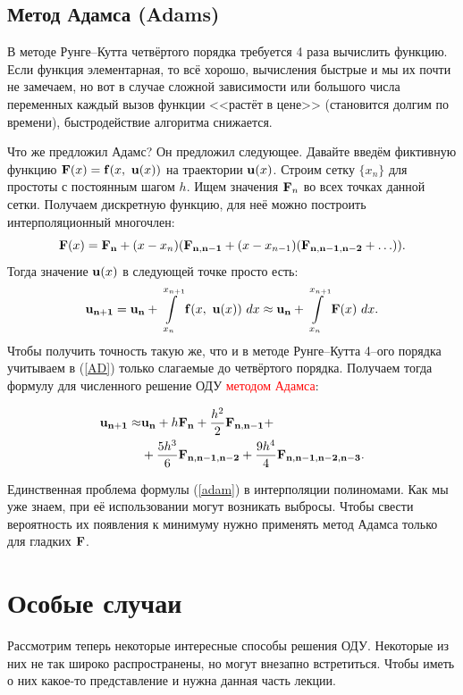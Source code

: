 \documentclass[a4,14pt,russian]{article}
\begin{document}
\subsection{Метод Адамса (Adams)}
    В методе Рунге--Кутта четвёртого порядка требуется 4 раза вычислить функцию. Если функция элементарная, то всё хорошо, вычисления быстрые и мы их почти не замечаем, но вот в случае сложной зависимости или большого числа переменных каждый вызов функции <<растёт в цене>> (становится долгим по времени), быстродействие алгоритма снижается.\par
    Что же предложил Адамс? Он предложил следующее. Давайте введём фиктивную функцию ${\bf F}(x) = {\bf f}(x,\ {\bf u}(x))$ на траектории ${\bf u}(x)$. Строим сетку $\{x_n \}$ для простоты с постоянным шагом $h$. Ищем значения ${\bf F}_n$ во всех точках данной сетки. Получаем дискретную функцию, для неё можно построить интерполяционный многочлен:
    \begin{equation}\label{AD}
        {\bf F}(x) = {\bf F_n}+(x-x_n)({\bf F_{n,n-1}}+(x-x_{n-1})({\bf F_{n,n-1,n-2}}+\ldots)).
    \end{equation}
    Тогда значение ${\bf u}(x)$ в следующей точке просто есть:
    \begin{equation}
        {\bf u_{n+1}} = {\bf u_{n}} + \int\limits_{x_n}^{x_{n+1}} {\bf f}(x,\ {\bf u}(x))\ dx \approx {\bf u_{n}} + \int\limits_{x_n}^{x_{n+1}} {\bf F}(x)\ dx. 
    \end{equation}
    Чтобы получить точность такую же, что и в методе Рунге--Кутта 4--ого порядка учитываем в (\ref{AD}) только слагаемые до четвёртого порядка. Получаем тогда формулу для численного решение ОДУ \textcolor{red}{методом Адамса}:
    
     \begin{equation}\label{adam}
     \begin{split}
        {\bf u_{n+1}} \approx & {\bf u_{n}} + h{\bf F_n}+\frac{h^2}{2}{\bf F_{n,n-1}} +\\
        &+\frac{5h^3}{6}{\bf F_{n,n-1,n-2}} + \frac{9h^4}{4}{\bf F_{n,n-1,n-2,n-3}}.
     \end{split}
     \end{equation}
    
    Единственная проблема формулы (\ref{adam}) в интерполяции полиномами. Как мы уже знаем, при её использовании могут возникать выбросы. Чтобы свести вероятность их появления к минимуму нужно применять метод Адамса только для гладких ${\bf F}$.
\section{Особые случаи}
    Рассмотрим теперь некоторые интересные способы решения ОДУ. Некоторые из них не так широко распространены, но могут внезапно встретиться. Чтобы иметь о них какое-то представление и нужна данная часть лекции.
\end{document}
